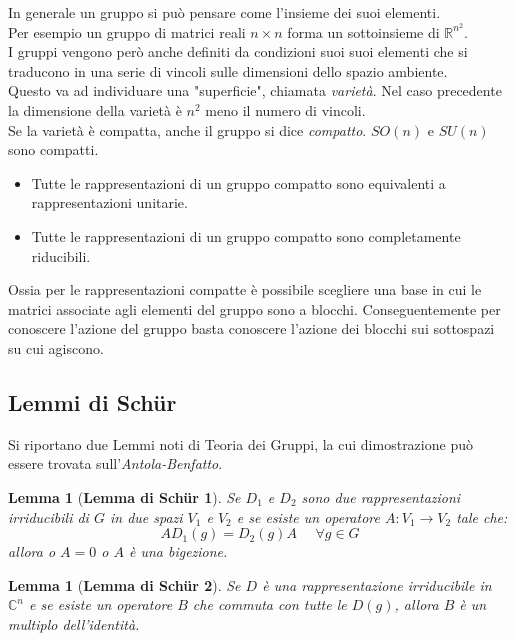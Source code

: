 \documentclass[twoside]{article}
\newtheorem{lemma}[theorem]{Lemma}
\begin{document}
In generale un gruppo si può pensare come l'insieme dei suoi elementi.
\\
Per esempio un gruppo di matrici reali $n \times n$ forma un sottoinsieme di $\mathds{R}^{n^2}$.
\\
I gruppi vengono però anche definiti da condizioni suoi suoi elementi che si traducono in una serie di vincoli sulle dimensioni dello spazio ambiente.
\\
Questo va ad individuare una "superficie", chiamata \textit{varietà}.
Nel caso precedente la dimensione della varietà è $n^2$ meno il numero di vincoli.
\\
Se la varietà è compatta, anche il gruppo si dice \textit{compatto}. $SO(n)$ e $SU(n)$ sono compatti.
\begin{itemize}
    \item Tutte le rappresentazioni di un gruppo compatto sono equivalenti a rappresentazioni unitarie.
    \item Tutte le rappresentazioni di un gruppo compatto sono completamente riducibili.
\end{itemize}
Ossia per le rappresentazioni compatte è possibile scegliere una base in cui le matrici associate agli elementi del gruppo sono a blocchi.
Conseguentemente per conoscere l'azione del gruppo basta conoscere l'azione dei blocchi sui sottospazi su cui agiscono.

\vspace{0.5cm}

\subsection{Lemmi di Sch\"ur}
Si riportano due Lemmi noti di Teoria dei Gruppi, la cui dimostrazione può essere trovata sull'\textit{Antola-Benfatto}.
\begin{lemma}[\textbf{Lemma di Sch\"ur 1}]
Se $D_1$ e $D_2$ sono due rappresentazioni irriducibili di $G$ in due spazi $V_1$ e $V_2$ e se esiste un operatore $A:V_1 \to V_2$ tale che:
\begin{equation}
    AD_1(g)=D_2(g)A \ \ \ \ \ \ \forall g \in G
\end{equation}
allora o $A=0$ o $A$ è una bigezione.
\end{lemma}

\begin{lemma}[\textbf{Lemma di Sch\"ur 2}] \label{Schur}
Se $D$ è una rappresentazione irriducibile in $\mathds{C}^n$ e se esiste un operatore $B$ che commuta con tutte le $D(g)$, allora $B$ è un multiplo dell'identità.
\end{lemma}
\end{document}
